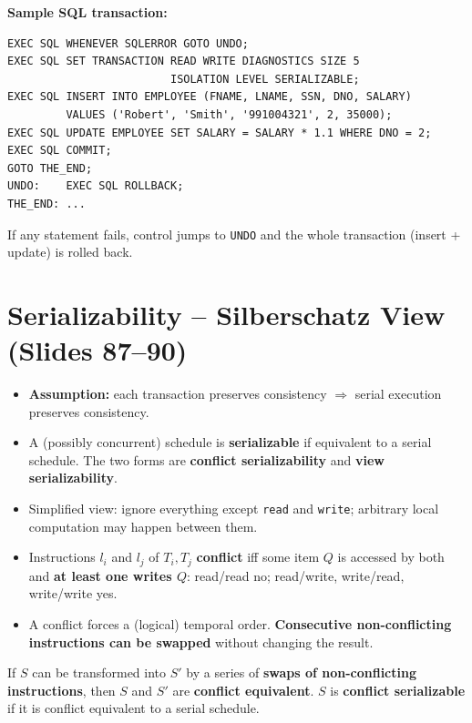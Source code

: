 \documentclass[10pt,a4paper]{article}
\newcommand{\op}[1]{\texttt{#1}}
\begin{document}
\textbf{Sample SQL transaction:}
\begin{verbatim}
EXEC SQL WHENEVER SQLERROR GOTO UNDO;
EXEC SQL SET TRANSACTION READ WRITE DIAGNOSTICS SIZE 5
                         ISOLATION LEVEL SERIALIZABLE;
EXEC SQL INSERT INTO EMPLOYEE (FNAME, LNAME, SSN, DNO, SALARY)
         VALUES ('Robert', 'Smith', '991004321', 2, 35000);
EXEC SQL UPDATE EMPLOYEE SET SALARY = SALARY * 1.1 WHERE DNO = 2;
EXEC SQL COMMIT;
GOTO THE_END;
UNDO:    EXEC SQL ROLLBACK;
THE_END: ...
\end{verbatim}
If any statement fails, control jumps to \op{UNDO} and the whole transaction (insert + update) is rolled back.

\section{Serializability -- Silberschatz View (Slides 87--90)}

\begin{itemize}
  \item \textbf{Assumption:} each transaction preserves consistency $\Rightarrow$ serial execution preserves consistency.
  \item A (possibly concurrent) schedule is \textbf{serializable} if equivalent to a serial schedule. The two forms are \textbf{conflict serializability} and \textbf{view serializability}.
  \item Simplified view: ignore everything except \texttt{read} and \texttt{write}; arbitrary local computation may happen between them.
  \item Instructions $l_i$ and $l_j$ of $T_i,T_j$ \textbf{conflict} iff some item $Q$ is accessed by both and \textbf{at least one writes $Q$}: read/read no; read/write, write/read, write/write yes.
  \item A conflict forces a (logical) temporal order. \textbf{Consecutive non-conflicting instructions can be swapped} without changing the result.
\end{itemize}

\begin{keybox}
If $S$ can be transformed into $S'$ by a series of \textbf{swaps of non-conflicting instructions}, then $S$ and $S'$ are \textbf{conflict equivalent}. $S$ is \textbf{conflict serializable} if it is conflict equivalent to a serial schedule.
\end{keybox}
\end{document}

